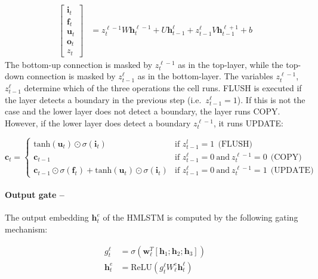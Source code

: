 \begin{align}
     \begin{bmatrix}
           \mathbf{i}_{t} \\
           \mathbf{f}_{t} \\
           \mathbf{u}_{t} \\
           \mathbf{o}_t \\
           z_t
       \end{bmatrix} &= z^{\ell-1}_t W \mathbf{h}^{\ell-1}_t + U \mathbf{h}^{\ell}_{t-1} + z^{\ell}_{t-1} V\mathbf{h}^{\ell+1}_{t-1}  + b 
\end{align}
The bottom-up connection is masked by $z^{\ell-1}_t$ as in
the top-layer, while the top-down connection is masked by 
$z^{\ell}_{t-1}$ as in the bottom-layer. The variables
$z^{\ell-1}_t$, $z^{\ell}_{t-1}$ determine which of the three
operations the cell runs. FLUSH is executed if the layer detects a boundary in the previous step (i.e.\ $z^{\ell}_{t-1}=1$).
If this is not the case and the lower layer does not detect a boundary, the layer runs COPY. However, if the lower layer does detect a boundary $z^{\ell-1}_t$, it runs UPDATE:

\begin{equation}
    \mathbf{c}_t = \begin{cases}  
            \text{tanh}(\mathbf{u}_t) \odot \sigma (\mathbf{i}_t) & \mbox{if } z^l_{t-1} = 1 \: \: \text{(FLUSH)}\\
            \mathbf{c}_{t-1} &  \mbox{if } z^\ell_{t-1} = 0 \: \mbox{and} \:  z^{\ell-1}_t = 0  \: \: \text{(COPY)}\\
            \mathbf{c}_{t-1} \odot \sigma (\mathbf{f}_t) + \text{tanh}(\mathbf{u}_t) \odot \sigma (\mathbf{i}_t) &
            \mbox{if } z^\ell_{t-1} = 0 \: \mbox{and} \:  z^{\ell-1}_t = 1  \: \: \text{(UPDATE)}
            \end{cases}
\end{equation}

\paragraph{Output gate --}
The output embedding $\mathbf{h}^e_t$ of the HMLSTM is computed by the following gating mechanism:

\begin{align}
g^\ell_t &= \sigma(\mathbf{w}_\ell^T [\mathbf{h}_1; \mathbf{h}_2; \mathbf{h}_3]) \\
\mathbf{h}^e_t &= \text{ReLU}(g^\ell_t W^e_\ell \mathbf{h}^\ell_t)
\end{align}

